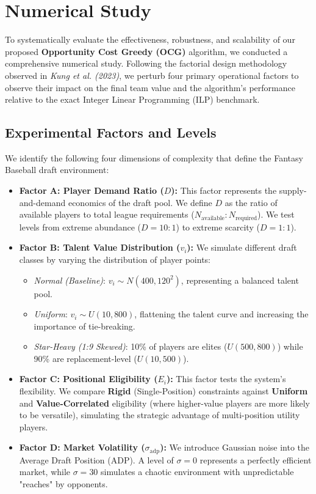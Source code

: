 \documentclass[11pt,a4paper]{article}
\begin{document}
\section{Numerical Study}

To systematically evaluate the effectiveness, robustness, and scalability of our proposed \textbf{Opportunity Cost Greedy (OCG)} algorithm, we conducted a comprehensive numerical study. Following the factorial design methodology observed in \textit{Kung et al. (2023)}, we perturb four primary operational factors to observe their impact on the final team value and the algorithm's performance relative to the exact Integer Linear Programming (ILP) benchmark.

\subsection{Experimental Factors and Levels}

We identify the following four dimensions of complexity that define the Fantasy Baseball draft environment:

\begin{itemize}
    \item \textbf{Factor A: Player Demand Ratio ($D$):} This factor represents the supply-and-demand economics of the draft pool. We define $D$ as the ratio of available players to total league requirements ($N_{\text{available}} : N_{\text{required}}$). We test levels from extreme abundance ($D = 10:1$) to extreme scarcity ($D = 1:1$).
    \item \textbf{Factor B: Talent Value Distribution ($v_i$):} We simulate different draft classes by varying the distribution of player points:
    \begin{itemize}
        \item \textit{Normal (Baseline)}: $v_i \sim N(400, 120^2)$, representing a balanced talent pool.
        \item \textit{Uniform}: $v_i \sim U(10, 800)$, flattening the talent curve and increasing the importance of tie-breaking.
        \item \textit{Star-Heavy (1:9 Skewed)}: 10\% of players are elites ($U(500, 800)$) while 90\% are replacement-level ($U(10, 500)$).
    \end{itemize}
    \item \textbf{Factor C: Positional Eligibility ($E_i$):} This factor tests the system's flexibility. We compare \textbf{Rigid} (Single-Position) constraints against \textbf{Uniform} and \textbf{Value-Correlated} eligibility (where higher-value players are more likely to be versatile), simulating the strategic advantage of multi-position utility players.
    \item \textbf{Factor D: Market Volatility ($\sigma_{\text{adp}}$):} We introduce Gaussian noise into the Average Draft Position (ADP). A level of $\sigma=0$ represents a perfectly efficient market, while $\sigma=30$ simulates a chaotic environment with unpredictable "reaches" by opponents.
\end{itemize}
\end{document}
